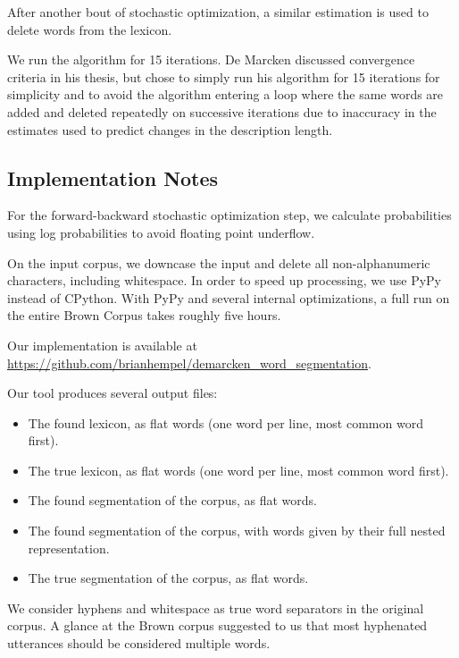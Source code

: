 \documentclass[11pt, oneside, fleqn]{article}
\begin{document}
  After another bout of stochastic optimization, a similar estimation is used to delete words from the lexicon. 
  
  We run the algorithm for 15 iterations. De Marcken discussed convergence criteria in his thesis, but chose to simply run his algorithm for 15 iterations for simplicity and to avoid the algorithm entering a loop where the same words are added and deleted repeatedly on successive iterations due to inaccuracy in the estimates used to predict changes in the description length.
  
  \subsection{Implementation Notes}
  
  For the forward-backward stochastic optimization step, we calculate probabilities using log probabilities to avoid floating point underflow.

  On the input corpus, we downcase the input and delete all non-alphanumeric characters, including whitespace. In order to speed up processing, we use PyPy instead of CPython. With PyPy and several internal optimizations, a full run on the entire Brown Corpus takes roughly five hours.
  
  Our implementation is available at \href{https://github.com/brianhempel/demarcken_word_segmentation}{https://github.com/brianhempel/demarcken\_word\_segmentation}.
  
  Our tool produces several output files:

  \begin{itemize}
    \item The found lexicon, as flat words (one word per line, most common word first).
    \item The true lexicon, as flat words (one word per line, most common word first).
    \item The found segmentation of the corpus, as flat words.
    \item The found segmentation of the corpus, with words given by their full nested representation.
    \item The true segmentation of the corpus, as flat words. 
  \end{itemize}

	We consider hyphens and whitespace as true word separators in the original corpus. A glance at the Brown corpus suggested to us that most hyphenated utterances should be considered multiple words.
\end{document}
